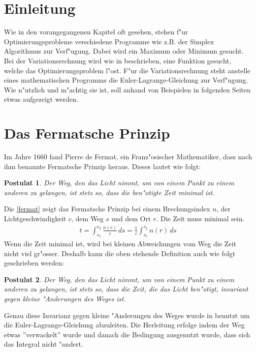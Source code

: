\newtheorem{postulat}{Postulat}

\section{Einleitung}
Wie in den vorangegangenen Kapitel oft gesehen, stehen f"ur
Optimierungsprobleme verschiedene Programme wie z.B. der Simplex
Algorithmus zur Verf"ugung. Dabei wird ein Maximum oder Minimum gesucht. Bei
der Variationsrechnung wird wie in 
beschrieben, eine Funktion gesucht, welche das Optimierungsproblem
l"ost. F"ur die Variationsrechnung steht anstelle eines mathematischen
Programms die Euler-Lagrange-Gleichung zur Verf"ugung. Wie n"utzlich und
m"achtig sie ist, soll anhand von Beispielen in folgenden Seiten etwas
aufgezeigt werden.
\section{Das Fermatsche Prinzip}
Im Jahre 1660 fand Pierre de Fermat, ein Franz"osischer Mathematiker,
dass  nach ihm benannte Fermatsche Prinzip heraus. 
Dieses lautet wie folgt:
\begin{postulat}
	Der Weg, den das Licht nimmt, 
	um von einem Punkt zu einem anderen zu gelangen, 
	ist stets so, dass die ben"otigte Zeit minimal ist.
	\cite{DefinitionFermat}
\end{postulat}
Die \eqref{fermat} zeigt das Fermatsche Prinzip bei einem Brechungsindex
$n$, 
der Lichtgeschwindigkeit $c$, dem Weg $s$ und dem Ort $r$. Die Zeit muss
minimal sein.
\begin{align}
	t= \int_{s_1}^{s_2} \frac{n(r)}{c}\, ds
= \frac{1}{c} \int_{s_1}^{s_2} n(r)\, ds
	\label{fermat}
\end{align}
Wenn die Zeit minimal ist, wird bei kleinen Abweichungen vom Weg die
Zeit nicht viel gr"osser. 
Deshalb kann die oben stehende Definition auch wie folgt geschrieben werden:
\begin{postulat}
Der Weg, den das Licht nimmt,  um von einem Punkt zu einem anderen zu
gelangen, 
ist stets so, dass die Zeit, die das Licht ben"otigt, invariant gegen
kleine "Anderungen des Weges ist.  \cite{DefinitionFermat}
\end{postulat}
Genau diese Invarianz gegen kleine "Anderungen des Weges
wurde in  benutzt um die
Euler-Lagrange-Gleichung abzuleiten. Die Herleitung erfolge indem der
Weg etwas ''verwackelt'' wurde und danach die Bedingung ausgenutzt wurde,
dass sich das Integral nicht "andert.

